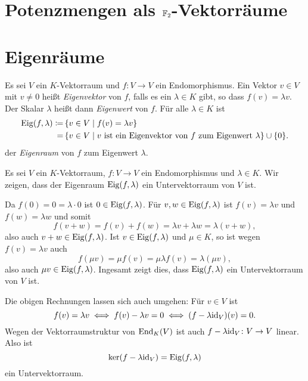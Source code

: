 \section{Potenzmengen als \texorpdfstring{$\mathbb{F}_2$}{F2}-Vektorräume}





\section{Eigenräume}
\begin{defi}
 Es sei $V$ ein $K$-Vektorraum und $f \colon V \to V$ ein Endomorphismus. Ein Vektor $v \in V$ mit $v \neq 0$ heißt \emph{Eigenvektor} von $f$, falls es ein $\lambda \in K$ gibt, so dass $f(v) = \lambda v$. Der Skalar $\lambda$ heißt dann \emph{Eigenwert} von $f$. Für alle $\lambda \in K$ ist
 \begin{align*}
  \mathrm{Eig}(f,\lambda)
  \coloneqq&\, \{v \in V \mid f(v) = \lambda v\} \\ 
  =&\, \{v \in V \mid \text{$v$ ist ein Eigenvektor von $f$ zum Eigenwert $\lambda$}\} \cup \{0\}.
 \end{align*}
 der \emph{Eigenraum} von $f$ zum Eigenwert $\lambda$.
\end{defi}

Es sei $V$ ein $K$-Vektorraum, $f \colon V \to V$ ein Endomorphismus und $\lambda \in K$. Wir zeigen, dass der Eigenraum $\mathrm{Eig}(f,\lambda)$ ein Untervektorraum von $V$ ist.

Da $f(0) = 0 = \lambda \cdot 0$ ist $0 \in \mathrm{Eig}(f,\lambda)$. Für $v,w \in \mathrm{Eig}(f,\lambda)$ ist $f(v) = \lambda v$ und $f(w) = \lambda w$ und somit
\[
 f(v+w)
 = f(v) + f(w)
 = \lambda v + \lambda w
 = \lambda (v+w),
\]
also auch $v+w \in \mathrm{Eig}(f,\lambda)$. Ist $v \in \mathrm{Eig}(f,\lambda)$ und $\mu \in K$, so ist wegen $f(v) = \lambda v$ auch
\[
 f(\mu v)
 = \mu f(v)
 = \mu \lambda f(v)
 = \lambda (\mu v),
\]
also auch $\mu v \in \mathrm{Eig}(f,\lambda)$. Ingesamt zeigt dies, dass $\mathrm{Eig}(f,\lambda)$ ein Untervektorraum von $V$ ist.

\begin{bem}
 Die obigen Rechnungen lassen sich auch umgehen: Für $v \in V$ ist
 \[
  f(v) = \lambda v
  \iff
  f(v) - \lambda v = 0
  \iff 
  (f - \lambda \mathrm{id}_V)(v) = 0.
 \]
 Wegen der Vektorraumstruktur von $\mathrm{End}_K(V)$ ist auch $f - \lambda \mathrm{id}_V \colon V \to V$ linear. Also ist
 \[
  \ker(f - \lambda \mathrm{id}_V) = \mathrm{Eig}(f,\lambda)
 \]
 ein Untervektorraum.
\end{bem}


